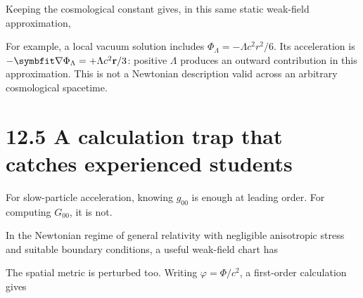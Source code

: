 \documentclass[
  11pt,
  letterpaper,
  oneside,
  openany]{scrbook}
\begin{document}
Keeping the cosmological constant gives, in this same static weak-field
approximation,

\begin{center}
\begingroup
{}
\ifdim\wd\grmathbox>\linewidth
\resizebox{\linewidth}{!}{\usebox{\grmathbox}}
\else\usebox{\grmathbox}\fi
\endgroup
\end{center}

For example, a local vacuum solution includes
\(\Phi_\Lambda=-\Lambda c^2r^2/6\). Its acceleration is
\(-\symbfit\nabla\Phi_\Lambda=+\Lambda c^2\mathbf r/3\): positive
\(\Lambda\) produces an outward contribution in this approximation. This
is not a Newtonian description valid across an arbitrary cosmological
spacetime.

\hypertarget{a-calculation-trap-that-catches-experienced-students}{%
\section{12.5 A calculation trap that catches experienced
students}\label{a-calculation-trap-that-catches-experienced-students}}

For slow-particle acceleration, knowing \(g_{00}\) is enough at leading
order. For computing \(G_{00}\), it is not.

In the Newtonian regime of general relativity with negligible
anisotropic stress and suitable boundary conditions, a useful weak-field
chart has

\begin{center}
\begingroup
{}
\ifdim\wd\grmathbox>\linewidth
\resizebox{\linewidth}{!}{\usebox{\grmathbox}}
\else\usebox{\grmathbox}\fi
\endgroup
\end{center}

The spatial metric is perturbed too. Writing \(\varphi=\Phi/c^2\), a
first-order calculation gives

\begin{center}
\begingroup
{}
\ifdim\wd\grmathbox>\linewidth
\resizebox{\linewidth}{!}{\usebox{\grmathbox}}
\else\usebox{\grmathbox}\fi
\endgroup
\end{center}
\end{document}
